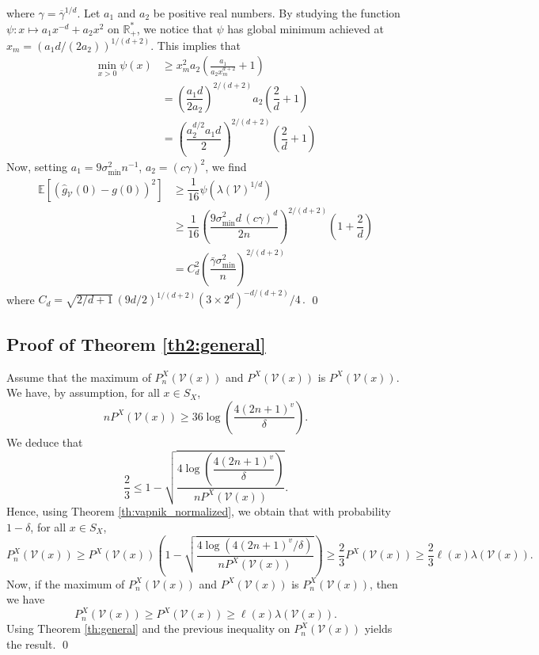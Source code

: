 \documentclass[paper=a4, fontsize=11pt]{scrartcl}
\newcommand{\EE}{\mathbb{E}}
\begin{document}
where $\gamma = \overline \gamma ^{1/d} $. Let \( a_1 \) and \( a_2 \) be positive real numbers. By studying the function \( \psi : x \mapsto a_1x^{-d} + a_2 x^2 \) on \(\mathbb R_+^*  \), we notice that \( \psi \) has global minimum achieved at \( x_m = (a_1d/(2a_2))^{1/(d+2)} \). This implies that \begin{align*}
\min_{x > 0} \psi (x) &\geq x_m^2 a_2 \left( \frac{ a_1 } {a_2x_m^{d +2 } }  + 1\right) 
\\ &= \left(\dfrac{a_1d}{2a_2}\right)^{2/(d+2)} a_2 \left( \dfrac{2}{d} +1  \right) 
\\ &= \left(\dfrac{a_2^{d/2}  a_1  d}{2}\right)^{2/(d+2)}  \left( \dfrac{2}{d} +1 \right)
\end{align*}
Now, setting \( a_1 = 9 \sigma^2_{\text{min}} n^{-1} \), \( a_2 = (c \gamma)^2 \), we find \begin{align*}
    \EE [ (\hat g_{\mathcal V} (0 ) -  g(0 ))^2 ] &\geq \dfrac{1}{16}\psi ( \lambda (\mathcal V)^{1/d}) \\ &\geq \dfrac{1}{16}
    \left(\dfrac{9\sigma^2_{\text{min}} d \, (c \gamma)^{d}}{2n}\right)^{2/(d+2)} \left(1 + \dfrac{2}{d}\right) \\  &= C_d ^2 \left(\dfrac{\bar\gamma \sigma^2_{\text{min}}}{n}\right)^{2/(d+2)}
\end{align*} where $C_d =  \sqrt{{2}/{d} + 1} \, \left({ 9d}/{2}\right)^{1/(d+2)} \left( 3 \times 2^d\right)^{-d/(d+2)}/4 \,.$ \qed


\subsection*{Proof of Theorem \ref{th2:general}}
Assume that the maximum of $P_n^X(\mathcal V(x))$ and $P^X(\mathcal V(x))$ is $P^X(\mathcal V(x)).$
We have, by assumption, for all $x\in S_X$,
$$ { n     P^X(\mathcal V(x)) }  \geq 36 \log\left(\dfrac{4 (2n+1) ^v }{\delta} \right). $$
We deduce that
$$ \frac 2 3 \leq 1 -   \sqrt{ \frac{4 \log\left(\dfrac{4 (2n+1) ^v }{\delta} \right) }{n     P^X(\mathcal V(x))} }.$$
Hence, using Theorem \ref{th:vapnik_normalized}, we obtain that with probability $1-\delta$, for all $x\in S_X$,
$$ P_n^X(\mathcal V(x)) \geq P^X(\mathcal V(x)) \left(1-\sqrt { \frac{4 \log( 4 (2n+1) ^v / \delta) }{ n P^X (\mathcal V(x))} } \right)\geq \frac 2 3P^X (\mathcal V(x))  \geq \frac 2 3\ell(x) \lambda (\mathcal V(x) ).$$
Now, if the maximum of $P_n^X(\mathcal V(x))$ and $P^X(\mathcal V(x))$ is $P_n^X(\mathcal V(x))$, then we have
$$ P_n^X(\mathcal V(x) ) \geq P^X(\mathcal V(x) )  \geq \ell(x) \lambda (\mathcal V(x) ).$$ %
Using Theorem \ref{th:general} and the previous inequality on $ P_n^X(\mathcal V(x) )$ yields the result. \qed
\end{document}
